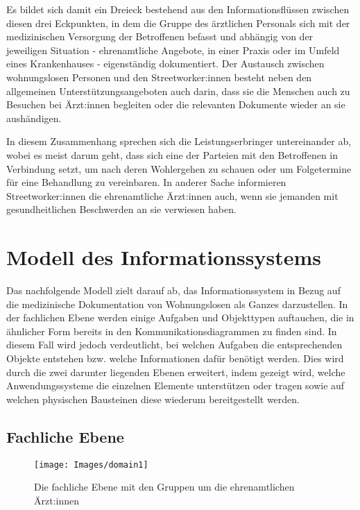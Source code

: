 Es bildet sich damit ein Dreieck bestehend aus den Informationsflüssen zwischen diesen drei Eckpunkten, in dem die Gruppe des ärztlichen Personals sich mit der medizinischen Versorgung der Betroffenen befasst und abhängig von der jeweiligen Situation - ehrenamtliche Angebote, in einer Praxis oder im Umfeld eines Krankenhauses - eigenständig dokumentiert. Der Austausch zwischen wohnungslosen Personen und den Streetworker:innen besteht neben den allgemeinen Unterstützungsangeboten auch darin, dass sie die Menschen auch zu Besuchen bei Ärzt:innen begleiten oder die relevanten Dokumente wieder an sie aushändigen.

In diesem Zusammenhang sprechen sich die Leistungserbringer untereinander ab, wobei es meist darum geht, dass sich eine der Parteien mit den Betroffenen in Verbindung setzt, um nach deren Wohlergehen zu schauen oder um Folgetermine für eine Behandlung zu vereinbaren. In anderer Sache informieren Streetworker:innen die ehrenamtliche Ärzt:innen auch, wenn sie jemanden mit gesundheitlichen Beschwerden an sie verwiesen haben.


\section{Modell des Informationssystems}\label{sec:3lgm2model}

Das nachfolgende Modell zielt darauf ab, das Informationssystem in Bezug auf die medizinische Dokumentation von Wohnungslosen als Ganzes darzustellen. In der fachlichen Ebene werden einige Aufgaben und Objekttypen auftauchen, die in ähnlicher Form bereits in den Kommunikationsdiagrammen zu finden sind. In diesem Fall wird jedoch verdeutlicht, bei welchen Aufgaben die entsprechenden Objekte entstehen bzw. welche Informationen dafür benötigt werden. Dies wird durch die zwei darunter liegenden Ebenen erweitert, indem gezeigt wird, welche Anwendungssysteme die einzelnen Elemente unterstützen oder tragen sowie auf welchen physischen Bausteinen diese wiederum bereitgestellt werden.

\subsection{Fachliche Ebene}

\begin{figure}[h]
	\centering
	\texttt{[image: Images/domain1]}
	\caption[Fachliche Ebene - Teil 1]{Die fachliche Ebene mit den Gruppen um die ehrenamtlichen Ärzt:innen}
	\label{fig:domain1}
\end{figure}

